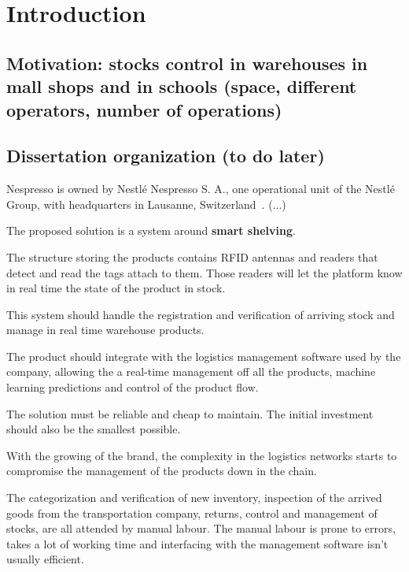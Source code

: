 \chapter{Introduction}

\section{Motivation: stocks control in warehouses in mall shops and in schools (space, different operators, number of operations)}

\section{Dissertation organization (to do later)}


Nespresso is owned by Nestlé Nespresso S. A., one operational 
unit of the Nestlé Group, with headquarters in Lausanne, 
Switzerland~\cite{nespressowebsite}. (...)

The proposed solution is a system around \textbf{smart shelving}. 

The structure storing the products contains RFID antennas and 
readers that detect and read the tags attach to them. Those 
readers will let the platform know in real time the state of 
the product in stock.

This system should handle the registration and verification 
of arriving stock and manage in real time warehouse products. 

The product should integrate with the logistics management 
software used by the company, allowing the a real-time 
management off all the products, machine learning predictions 
and control of the product flow.

The solution must be reliable and cheap to maintain. The 
initial investment should also be the smallest possible. 


With the growing of the brand, the complexity in the logistics 
networks starts to compromise the management of the products 
down in the chain. 

The categorization and verification of new inventory, inspection 
of the arrived goods from the transportation company, returns, 
control and management of stocks, are all attended by manual 
labour. 
The manual labour is prone to errors, takes a lot of working 
time and interfacing with the management software isn't usually 
efficient.

